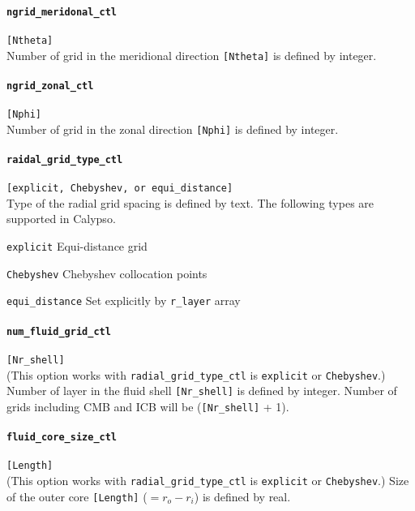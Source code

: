 \paragraph{\tt ngrid\_meridonal\_ctl}
\label{href_t:ngrid_meridonal_ctl}
\verb|[Ntheta]| \\
Number of grid in the meridional direction \verb|[Ntheta]| is defined by integer.

\paragraph{\tt ngrid\_zonal\_ctl}
\label{href_t:ngrid_zonal_ctl}
\verb|[Nphi]| \\
Number of grid in the zonal direction \verb|[Nphi]| is defined by integer.

\paragraph{\tt raidal\_grid\_type\_ctl}
\label{href_t:radial_grid_type_ctl}
\verb|[explicit, Chebyshev, or equi_distance]| \\
Type of the radial grid spacing is defined by text. The following types are supported in Calypso.
%
\begin{description}
	\item{\tt explicit}  Equi-distance grid
	\item{\tt Chebyshev} Chebyshev collocation points
	\item{\tt equi\_distance} Set explicitly by \verb|r_layer| array
\end{description}
%

\paragraph{\tt num\_fluid\_grid\_ctl}
\label{href_t:num_fluid_grid_ctl}
\verb|[Nr_shell]| \\
(This option works with \verb|radial_grid_type_ctl| is {\tt explicit} or {\tt Chebyshev}.)
Number of layer in the fluid shell \verb|[Nr_shell]| is defined by integer. Number of grids including CMB and ICB will be (\verb|[Nr_shell]| + 1).

\paragraph{\tt fluid\_core\_size\_ctl}
\label{href_t:fluid_core_size_ctl}
\verb|[Length]| \\
(This option works with \verb|radial_grid_type_ctl| is {\tt explicit} or {\tt Chebyshev}.)
Size of the outer core \verb|[Length]| ($ = r_{o}-r_{i}$) is defined by real.

